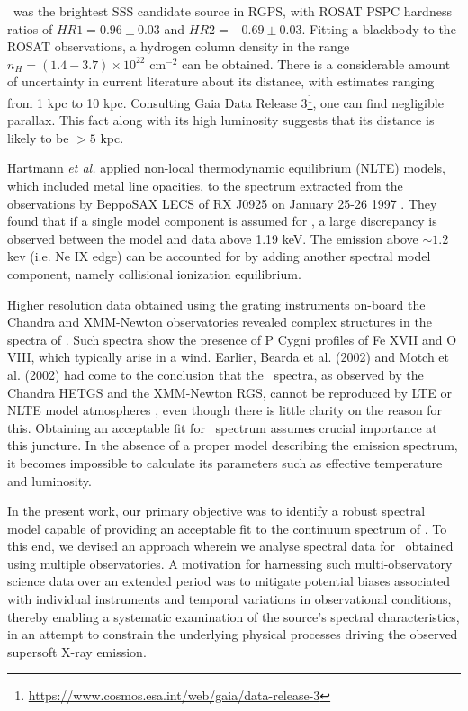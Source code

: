 	\source\ was the brightest SSS candidate source in RGPS, with ROSAT PSPC hardness ratios of $HR1=0.96\pm 0.03$ and $HR2=-0.69\pm 0.03$. Fitting a blackbody to the ROSAT observations, a hydrogen column density in the range $n_H=(1.4-3.7)\times 10^{22}$ cm$^{-2}$ can be obtained. There is a considerable amount of uncertainty in current literature about its distance, with estimates ranging from 1 kpc to 10 kpc. Consulting Gaia Data Release 3\footnote{\url{https://www.cosmos.esa.int/web/gaia/data-release-3}}, one can find negligible parallax. This fact along with its high luminosity suggests that its distance is likely to be $>5$ kpc.
	
	Hartmann \textit{et al.} applied non-local thermodynamic equilibrium (NLTE) models, which included metal line opacities, to the spectrum extracted from the observations by BeppoSAX LECS of RX J0925 on January 25-26 1997 \cite{hartmann1999constraining}. They found that if a single model component is assumed for \source, a large discrepancy is observed between the model and data above 1.19 keV. The emission above $\sim 1.2$ kev (i.e. Ne IX edge) can be accounted for by adding another spectral model component, namely collisional ionization equilibrium.
	
	Higher resolution data obtained using the grating instruments on-board the Chandra and XMM-Newton observatories revealed complex structures in the spectra of \source. Such spectra show the presence of P Cygni profiles of Fe XVII and O VIII, which typically arise in a wind. Earlier, Bearda et al. (2002) and Motch et al. (2002) had come to the conclusion that the \source\ spectra, as observed by the Chandra HETGS and the XMM-Newton RGS, cannot be reproduced by LTE or NLTE model atmospheres \cite{beardaChandra2002AA,motchXmmNewton2002AA}, even though there is little clarity on the reason for this. Obtaining an acceptable fit for \source\ spectrum assumes crucial importance at this juncture. In the absence of a proper model describing the emission spectrum, it becomes impossible to calculate its parameters such as effective temperature and luminosity.
	
	In the present work, our primary objective was to identify a robust spectral model capable of providing an acceptable fit to the continuum spectrum of \source. To this end, we devised an approach wherein we analyse spectral data for \source\ obtained using multiple observatories. A motivation for harnessing such multi-observatory science data over an extended period was to mitigate potential biases associated with individual instruments and temporal variations in observational conditions, thereby enabling a systematic examination of the source's spectral characteristics, in an attempt to constrain the underlying physical processes driving the observed supersoft X-ray emission.
	
